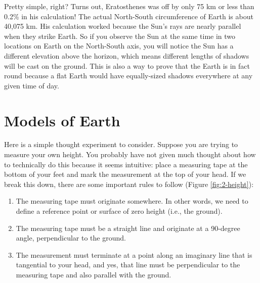 \documentclass[
]{book}
\providecommand{\tightlist}{%
  \setlength{\itemsep}{0pt}\setlength{\parskip}{0pt}}
\begin{document}
Pretty simple, right? Turns out, Eratosthenes was off by only 75 km or less than 0.2\% in his calculation! The actual North-South circumference of Earth is about 40,075 km. His calculation worked because the Sun's rays are nearly parallel when they strike Earth. So if you observe the Sun at the same time in two locations on Earth on the North-South axis, you will notice the Sun has a different elevation above the horizon, which means different lengths of shadows will be cast on the ground. This is also a way to prove that the Earth is in fact round because a flat Earth would have equally-sized shadows everywhere at any given time of day.

\hypertarget{models-of-earth}{%
\section{Models of Earth}\label{models-of-earth}}

Here is a simple thought experiment to consider. Suppose you are trying to measure your own height. You probably have not given much thought about how to technically do this because it seems intuitive: place a measuring tape at the bottom of your feet and mark the measurement at the top of your head. If we break this down, there are some important rules to follow (Figure \ref{fig:2-height}):

\begin{enumerate}
\def\labelenumi{\arabic{enumi}.}
\tightlist
\item
  The measuring tape must originate somewhere. In other words, we need to define a reference point or surface of zero height (i.e., the ground).
\item
  The measuring tape must be a straight line and originate at a 90-degree angle, perpendicular to the ground.
\item
  The measurement must terminate at a point along an imaginary line that is tangential to your head, and yes, that line must be perpendicular to the measuring tape and also parallel with the ground.
\end{enumerate}
\end{document}

